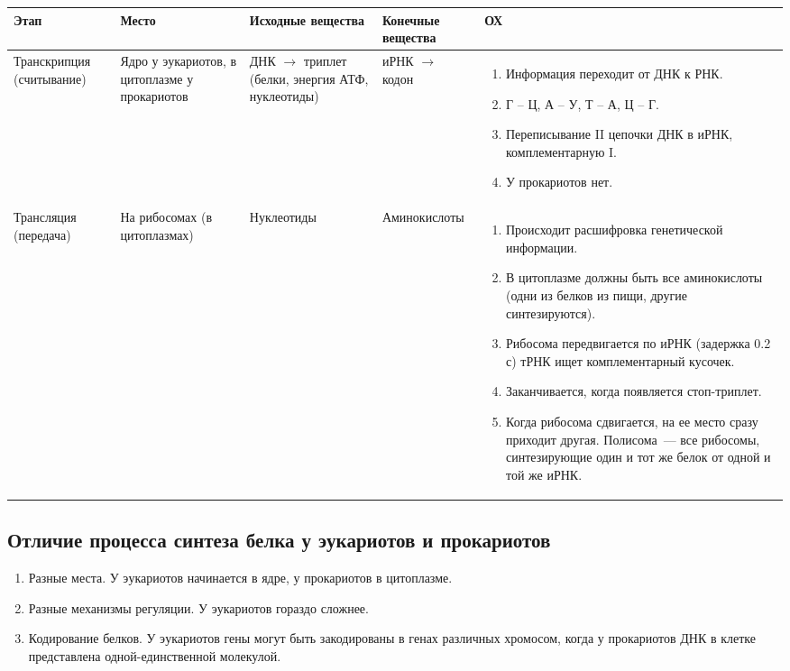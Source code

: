 \documentclass[12pt]{article}
\begin{document}
	\begin{xltabular}{\textwidth}{|p{0.15\textwidth}|p{0.1\textwidth}|p{0.15\textwidth}|p{0.15\textwidth}|X|}
		\hline
		Этап & Место & Исходные вещества & Конечные вещества & ОХ \\
		\hline
		Транскрипция (считывание) & Ядро у эукариотов, в цитоплазме у прокариотов & ДНК $\rightarrow$ триплет (белки, энергия АТФ, нуклеотиды) & иРНК $\rightarrow$ кодон &
		\begin{enumerate}[1)]
			\item Информация переходит от ДНК к РНК.
			\item Г -- Ц, А -- У, Т -- А, Ц -- Г.
			\item Переписывание II цепочки ДНК в иРНК, комплементарную I.
			\item У прокариотов нет.
		\end{enumerate} \\
		\hline
		Трансляция (передача) & На рибосомах (в цитоплазмах) & Нуклеотиды & Аминокислоты &
		\begin{enumerate}[1)]
			\item Происходит расшифровка генетической информации.
			\item В цитоплазме должны быть все аминокислоты (одни из белков из пищи, другие синтезируются).
			\item Рибосома передвигается по иРНК (задержка 0.2 с)
			тРНК ищет комплементарный кусочек.
			\item Заканчивается, когда появляется стоп-триплет.
			\item Когда рибосома сдвигается, на ее место сразу приходит другая. Полисома~--- все рибосомы, синтезирующие один и тот же белок от одной и той же иРНК.
		\end{enumerate} \\
		\hline
	\end{xltabular}
	\subsection{Отличие процесса синтеза белка у эукариотов и прокариотов}
	\begin{enumerate}
		\item Разные места. У эукариотов начинается в ядре, у прокариотов в цитоплазме.
		\item Разные механизмы регуляции. У эукариотов гораздо сложнее.
		\item Кодирование белков. У эукариотов гены могут быть закодированы в генах различных хромосом, когда у прокариотов ДНК в клетке представлена одной-единственной молекулой.
	\end{enumerate}
\end{document}
